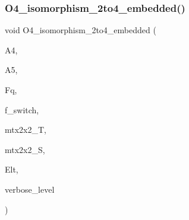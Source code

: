 \mbox{\label{action__global_8_c_aa6a3808993602713a701a20d3905ebe1}} 
\subsubsection{\texorpdfstring{O4\+\_\+isomorphism\+\_\+2to4\+\_\+embedded()}{O4\_isomorphism\_2to4\_embedded()}}
{\footnotesize\ttfamily void O4\+\_\+isomorphism\+\_\+2to4\+\_\+embedded (\begin{DoxyParamCaption}\item[{\mbox{\hyperlink{classaction}{action}} $\ast$}]{A4,  }\item[{\mbox{\hyperlink{classaction}{action}} $\ast$}]{A5,  }\item[{\mbox{\hyperlink{classfinite__field}{finite\+\_\+field}} $\ast$}]{Fq,  }\item[{\mbox{\hyperlink{galois_8h_a09fddde158a3a20bd2dcadb609de11dc}{I\+NT}}}]{f\+\_\+switch,  }\item[{\mbox{\hyperlink{galois_8h_a09fddde158a3a20bd2dcadb609de11dc}{I\+NT}} $\ast$}]{mtx2x2\+\_\+T,  }\item[{\mbox{\hyperlink{galois_8h_a09fddde158a3a20bd2dcadb609de11dc}{I\+NT}} $\ast$}]{mtx2x2\+\_\+S,  }\item[{\mbox{\hyperlink{galois_8h_a09fddde158a3a20bd2dcadb609de11dc}{I\+NT}} $\ast$}]{Elt,  }\item[{\mbox{\hyperlink{galois_8h_a09fddde158a3a20bd2dcadb609de11dc}{I\+NT}}}]{verbose\+\_\+level }\end{DoxyParamCaption})}

\mbox{\label{action__global_8_c_af20467afc2151efb154c3c86ae5e1e5a}} 
